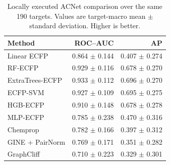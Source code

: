 \begin{table}[t]
\centering
\caption{Locally executed ACNet comparison over the same 190 targets. Values are target-macro mean $\mathbin{\pm}$ standard deviation. Higher is better.}
\label{tab:acnet-local-macro}
\scriptsize
\begin{tabular}{lrr}
\toprule
Method & ROC--AUC & AP\\
\midrule
Linear ECFP & 0.864 $\mathbin{\pm}$ 0.144 & 0.407 $\mathbin{\pm}$ 0.274\\
RF-ECFP & 0.929 $\mathbin{\pm}$ 0.116 & 0.678 $\mathbin{\pm}$ 0.270\\
ExtraTrees-ECFP & 0.933 $\mathbin{\pm}$ 0.112 & 0.696 $\mathbin{\pm}$ 0.270\\
ECFP-SVM & 0.927 $\mathbin{\pm}$ 0.109 & 0.695 $\mathbin{\pm}$ 0.275\\
HGB-ECFP & 0.910 $\mathbin{\pm}$ 0.148 & 0.678 $\mathbin{\pm}$ 0.278\\
MLP-ECFP & 0.785 $\mathbin{\pm}$ 0.238 & 0.470 $\mathbin{\pm}$ 0.316\\
Chemprop & 0.782 $\mathbin{\pm}$ 0.166 & 0.397 $\mathbin{\pm}$ 0.312\\
GINE + PairNorm & 0.769 $\mathbin{\pm}$ 0.171 & 0.351 $\mathbin{\pm}$ 0.282\\
GraphCliff & 0.710 $\mathbin{\pm}$ 0.223 & 0.329 $\mathbin{\pm}$ 0.301\\
\bottomrule
\end{tabular}
\end{table}
